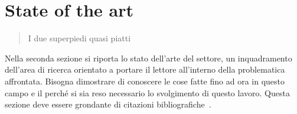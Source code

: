 \chapter{State of the art}
\label{capitolo2}
\thispagestyle{empty}

\begin{quotation}
{\footnotesize
{}
\begin{flushright}
I due superpiedi quasi piatti
\end{flushright}
}
\end{quotation}
\vspace{0.5cm}

\noindent Nella seconda sezione si riporta lo stato dell'arte del settore, un inquadramento dell'area di ricerca orientato a portare il lettore all'interno della problematica affrontata. Bisogna dimostrare di conoscere le cose fatte fino ad ora in questo campo e il perch\'e si sia reso necessario lo svolgimento di questo lavoro. Questa sezione deve essere grondante di citazioni bibliografiche~\cite{marco02bud}.

